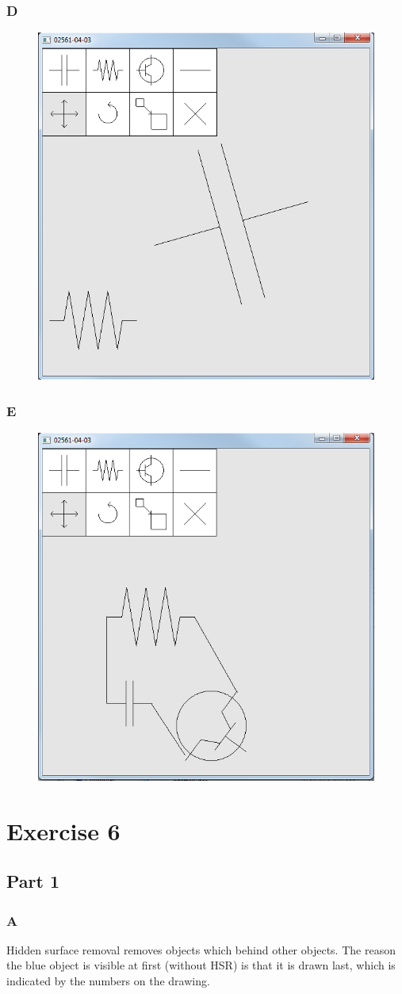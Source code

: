 \documentclass[11pt]{article}
\begin{document}
\subsubsection{D}
\begin{figure}[H]
	\centering
	\includegraphics[width=0.5\linewidth]{images/e05p3d}
	\label{fig:e05p3d}
\end{figure}

\subsubsection{E}
\begin{figure}[H]
	\centering
	\includegraphics[width=0.5\linewidth]{images/e05p3f}
	\label{fig:e05p3f}
\end{figure}



\section{Exercise 6}
\subsection{Part 1}
\subsubsection{A}
Hidden surface removal removes objects which behind other objects. The reason the blue object is visible at first (without HSR) is that it is drawn last, which is indicated by the numbers on the drawing.
\end{document}
